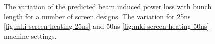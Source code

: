 \begin{figure}
\label{fig:mki-screens-heating-bunch-length}
\caption{The variation of the predicted beam induced power loss with bunch length for a number of screen designs. The variation for 25ns \ref{fig:mki-screen-heating-25ns} and 50ns \ref{fig:mki-screen-heating-50ns} machine settings.}
\end{figure}
